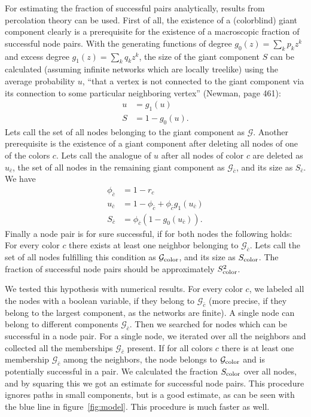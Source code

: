 \documentclass[aps, pre, onecolumn, a4paper, floatfix]{revtex4}
\begin{document}
For estimating the fraction of successful pairs analytically, results from percolation 
theory can be used. First of all, the existence of a (colorblind) giant component clearly is a 
prerequisite for the existence of a macroscopic fraction of successful node pairs. With the 
generating functions of degree $g_0(z)=\sum_k p_k z^k$ and excess degree 
$g_1(z)=\sum_k q_k z^k$, the size of the giant component $S$ can be calculated (assuming infinite
networks which are locally treelike) using 
the average probability $u$, ``that a vertex is not connected to the giant component 
via its connection to some particular neighboring vertex'' (Newman, page 461): 
\begin{align}
u &= g_1(u)\\
S &= 1 - g_0(u).
\end{align}
Lets call the set of all nodes belonging to the giant component as ${\mathcal G}$. 
Another prerequisite is the existence of a giant component after deleting all nodes of one 
of the colors $c$. Lets call the analogue of $u$ after all nodes of color $c$ are 
deleted as $u_{\bar c}$, the set of all nodes in the remaining giant component as 
${\mathcal G}_{\bar c}$, and its size as $S_{\bar c}$. 
We have 
\begin{align}
\phi_{\bar c} &= 1-r_c\\
u_{\bar c} &= 1-\phi_{\bar c} + \phi_{\bar c} g_1(u_{\bar c})\\
S_{\bar c} &= \phi_{\bar c} (1-g_0(u_{\bar c})).
\end{align}
Finally a node pair is for sure successful, if for both nodes the following 
holds: For every color $c$ there exists at least one neighbor belonging to 
${\mathcal G}_{\bar c}$. Lets call the set of all nodes fulfilling this 
condition as ${\mathcal G}_{\rm color}$, and its size as $S_{\rm color}$. 
The fraction of successful node pairs should be approximately $S_{\rm color}^2$. 

We tested this hypothesis with numerical results. For every color $c$, we labeled all the 
nodes with a boolean variable, if they belong to ${\mathcal G}_{\bar c}$ (more precise, if they 
belong to the largest component, as the networks are finite). A single node can 
belong to different components ${\mathcal G}_{\bar c}$. Then we searched for 
nodes which can be successful in a node pair. For a single node, we iterated over 
all the neighbors and collected all the memberships ${\mathcal G}_{\bar c}$ present. If for 
all colors $c$ there is at least one membership ${\mathcal G}_{\bar c}$ among the neighbors, 
the node belongs to ${\mathcal G}_{\rm color}$ and is
potentially successful in a pair. We calculated the 
fraction $S_{\rm color}$ over all nodes, and by squaring this we got an estimate for 
successful node pairs. This procedure ignores paths in small components, but 
is a good estimate, as can be seen with the blue line in figure~\ref{fig:model}. 
This procedure is much faster as well.
\end{document}
